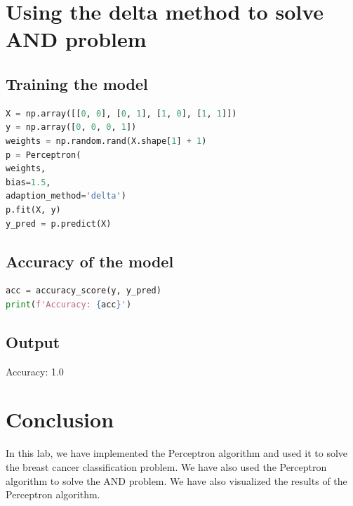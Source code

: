 \section{Using the delta method to solve AND problem}
\subsection{Training the model}
\begin{lstlisting}[language=Python]
X = np.array([[0, 0], [0, 1], [1, 0], [1, 1]])
y = np.array([0, 0, 0, 1])
weights = np.random.rand(X.shape[1] + 1)
p = Perceptron(
weights, 
bias=1.5, 
adaption_method='delta')
p.fit(X, y)
y_pred = p.predict(X)
\end{lstlisting}
\subsection{Accuracy of the model}
\begin{lstlisting}[language=Python]
acc = accuracy_score(y, y_pred)
print(f'Accuracy: {acc}')
\end{lstlisting}
\subsection{Output}
Accuracy: 1.0

\section{Conclusion}
In this lab, we have implemented the Perceptron algorithm and used it to solve the breast cancer classification problem. We have also used the Perceptron algorithm to solve the AND problem. We have also visualized the results of the Perceptron algorithm.
